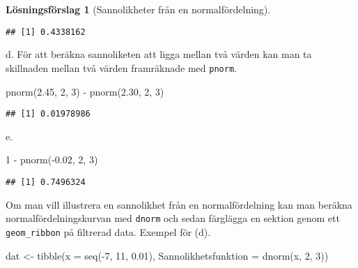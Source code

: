\documentclass[
]{book}
\newenvironment{Shaded}{\begin{snugshade}}{\end{snugshade}}
\newcommand{\AttributeTok}[1]{\textcolor[rgb]{0.77,0.63,0.00}{#1}}
\newcommand{\DecValTok}[1]{\textcolor[rgb]{0.00,0.00,0.81}{#1}}
\newcommand{\FloatTok}[1]{\textcolor[rgb]{0.00,0.00,0.81}{#1}}
\newcommand{\FunctionTok}[1]{\textcolor[rgb]{0.00,0.00,0.00}{#1}}
\newcommand{\NormalTok}[1]{#1}
\newcommand{\OtherTok}[1]{\textcolor[rgb]{0.56,0.35,0.01}{#1}}
\newcommand{\SpecialCharTok}[1]{\textcolor[rgb]{0.00,0.00,0.00}{#1}}
\theoremstyle{definition}
\theoremstyle{definition}
\theoremstyle{definition}
\theoremstyle{definition}
\newtheorem{hypothesis}{Lösningsförslag}[chapter]
\theoremstyle{remark}
\begin{document}
\begin{hypothesis}[Sannolikheter från en normalfördelning]
\begin{verbatim}
## [1] 0.4338162
\end{verbatim}

d. För att beräkna sannoliketen att ligga mellan två värden kan man ta skillnaden mellan två värden framräknade med \texttt{pnorm}.

\begin{Shaded}
\begin{Highlighting}[]
\FunctionTok{pnorm}\NormalTok{(}\FloatTok{2.45}\NormalTok{, }\DecValTok{2}\NormalTok{, }\DecValTok{3}\NormalTok{) }\SpecialCharTok{{-}} \FunctionTok{pnorm}\NormalTok{(}\FloatTok{2.30}\NormalTok{, }\DecValTok{2}\NormalTok{, }\DecValTok{3}\NormalTok{)}
\end{Highlighting}
\end{Shaded}

\begin{verbatim}
## [1] 0.01978986
\end{verbatim}

e.

\begin{Shaded}
\begin{Highlighting}[]
\DecValTok{1} \SpecialCharTok{{-}} \FunctionTok{pnorm}\NormalTok{(}\SpecialCharTok{{-}}\FloatTok{0.02}\NormalTok{, }\DecValTok{2}\NormalTok{, }\DecValTok{3}\NormalTok{)}
\end{Highlighting}
\end{Shaded}

\begin{verbatim}
## [1] 0.7496324
\end{verbatim}

Om man vill illustrera en sannolikhet från en normalfördelning kan man beräkna normalfördelningskurvan med \texttt{dnorm} och sedan färglägga en sektion genom ett \texttt{geom\_ribbon} på filtrerad data. Exempel för (d).

\begin{Shaded}
\begin{Highlighting}[]
\NormalTok{dat }\OtherTok{\textless{}{-}} \FunctionTok{tibble}\NormalTok{(}\AttributeTok{x =} \FunctionTok{seq}\NormalTok{(}\SpecialCharTok{{-}}\DecValTok{7}\NormalTok{, }\DecValTok{11}\NormalTok{, }\FloatTok{0.01}\NormalTok{),}
              \AttributeTok{Sannolikhetsfunktion =} \FunctionTok{dnorm}\NormalTok{(x, }\DecValTok{2}\NormalTok{, }\DecValTok{3}\NormalTok{))}


\end{Highlighting}
\end{Shaded}
\end{hypothesis}
\end{document}
